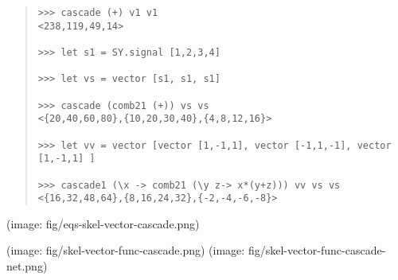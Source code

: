 \begin{haddockdesc}
\begin{quote}
{\begin{verbatim}
>>> cascade (+) v1 v1
<238,119,49,14>

>>> let s1 = SY.signal [1,2,3,4]

>>> let vs = vector [s1, s1, s1]

>>> cascade (comb21 (+)) vs vs
<{20,40,60,80},{10,20,30,40},{4,8,12,16}>

>>> let vv = vector [vector [1,-1,1], vector [-1,1,-1], vector [1,-1,1] ]

>>> cascade1 (\x -> comb21 (\y z-> x*(y+z))) vv vs vs
<{16,32,48,64},{8,16,24,32},{-2,-4,-6,-8}>

\end{verbatim}}
\end{quote}(image: fig/eqs-skel-vector-cascade.png)\par
           (image: fig/skel-vector-func-cascade.png)
 (image: fig/skel-vector-func-cascade-net.png)\par
           
\end{haddockdesc}
